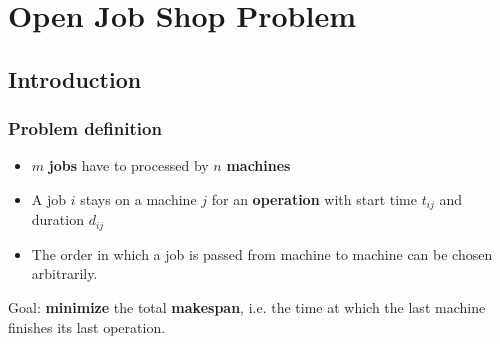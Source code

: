 \section{Open Job Shop Problem}
\subsection{Introduction}
\begin{frame}
  \frametitle{Problem definition}

  \begin{itemize}
    \item $m$ \textbf{jobs} have to processed by $n$ \textbf{machines}
    \item A job $i$ stays on a machine $j$ for an \textbf{operation} with start time $t_{ij}$ and duration $d_{ij}$
    \item The order in which a job is passed from machine to machine can be chosen arbitrarily.
  \end{itemize}

  Goal: \textbf{minimize} the total \textbf{makespan}, i.e. the time at which the last machine finishes its last operation.

 	

\end{frame}

